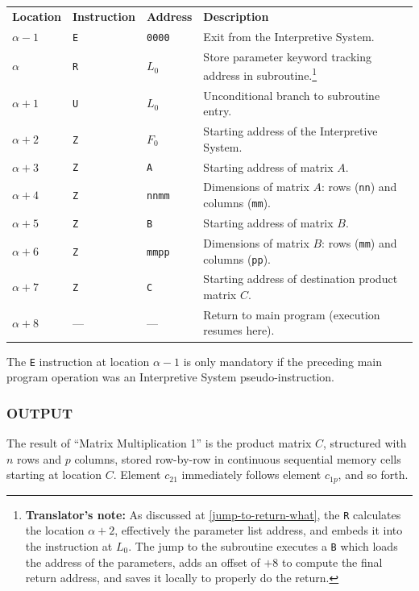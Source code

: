 \documentclass{article}
\begin{document}
\medskip
\noindent
\begin{tabular}{llll}
\textbf{Location} & \textbf{Instruction} & \textbf{Address} & \textbf{Description} \\
$\alpha - 1$      & \texttt{E}            & \texttt{0000}    & Exit from the Interpretive System. \\
$\alpha$          & \texttt{R}            & \texttt{$L_0$}       & Store parameter keyword tracking address in subroutine.\footnote{\textbf{Translator's note:} As discussed at \ref{jump-to-return-what}, the \texttt{R} calculates the location $\alpha+2$, effectively the parameter list address, and embeds it into the instruction at \texttt{$L_0$}. The jump to the subroutine executes a \texttt{B} which loads the address of the parameters, adds an offset of $+8$ to compute the final return address, and saves it locally to properly do the return.} \\
$\alpha + 1$      & \texttt{U}            & \texttt{$L_0$}       & Unconditional branch to subroutine entry. \\
$\alpha + 2$      & \texttt{Z}            & \texttt{$F_0$}       & Starting address of the Interpretive System. \\
$\alpha + 3$      & \texttt{Z}            & \texttt{A}       & Starting address of matrix $A$. \\
$\alpha + 4$      & \texttt{Z}            & \texttt{nnmm}    & Dimensions of matrix $A$: rows (\texttt{nn}) and columns (\texttt{mm}). \\
$\alpha + 5$      & \texttt{Z}            & \texttt{B}       & Starting address of matrix $B$. \\
$\alpha + 6$      & \texttt{Z}            & \texttt{mmpp}    & Dimensions of matrix $B$: rows (\texttt{mm}) and columns (\texttt{pp}). \\
$\alpha + 7$      & \texttt{Z}            & \texttt{C}       & Starting address of destination product matrix $C$. \\
$\alpha + 8$      & ---                   & ---              & Return to main program (execution resumes here).
\end{tabular}

\medskip
\noindent
The \texttt{E} instruction at location $\alpha - 1$ is only mandatory if the preceding main program operation was an Interpretive System pseudo-instruction.

\subsubsection*{OUTPUT}
The result of ``Matrix Multiplication 1'' is the product matrix $C$, structured with $n$ rows and $p$ columns, stored row-by-row in continuous sequential memory cells starting at location $C$. Element $c_{21}$ immediately follows element $c_{1p}$, and so forth.
\end{document}

